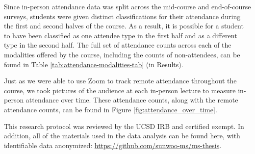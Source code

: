 Since in-person attendance data was split across the mid-course and end-of-course surveys, students were given distinct classifications for their attendance during the first and second halves of the course. As a result, it is possible for a student to have been classified as one attendee type in the first half and as a different type in the second half. The full set of attendance counts across each of the modalities offered by the course, including the counts of non-attendees, can be found in Table \ref{tab:attendance-modalities-tab} (in Results).

Just as we were able to use Zoom to track remote attendance throughout the course, we took pictures of the audience at each in-person lecture to measure in-person attendance over time. These attendance counts, along with the remote attendance counts, can be found in Figure \ref{fig:attendance_over_time}.

This research protocol was reviewed by the UCSD IRB and certified exempt. In addition, all of the materials used in the data analysis can be found here, with identifiable data anonymized: \url{https://github.com/sunwoo-ms/ms-thesis}.